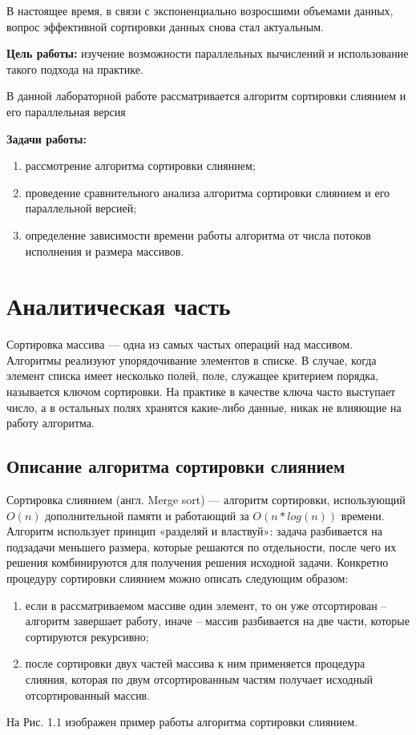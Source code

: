 \documentclass[12pt]{report}
\begin{document}
В настоящее время, в связи с экспоненциально возросшими объемами данных, вопрос эффективной сортировки данных снова стал актуальным.\vspace{\baselineskip} 

\textbf{Цель работы:} изучение возможности параллельных вычислений и использование такого подхода на практике.\vspace{\baselineskip}

В данной лабораторной работе рассматривается алгоритм сортировки слиянием и его параллельная версия\vspace{\baselineskip}

\textbf{Задачи работы:}
\begin{enumerate}
	\item рассмотрение алгоритма сортировки слиянием;
	\item проведение сравнительного анализа алгоритма сортировки слиянием и его параллельной версией;
	\item определение зависимости времени работы алгоритма от числа потоков исполнения и размера массивов.
\end{enumerate}

\chapter{Аналитическая часть}

Сортировка массива — одна из самых частых операций над массивом. Алгоритмы реализуют упорядочивание элементов в списке. В случае, когда элемент списка имеет несколько полей, поле, служащее критерием порядка, называется ключом сортировки. На практике в качестве ключа
часто выступает число, а в остальных полях хранятся какие-либо данные,
никак не влияющие на работу алгоритма.

\section{Описание алгоритма сортировки слиянием}

Сортировка слиянием (англ. Merge sort) — алгоритм сортировки, использующий $O(n)$ дополнительной памяти и работающий за $O(n*log(n))$ времени.  Алгоритм использует принцип «разделяй и властвуй»: задача разбивается на подзадачи меньшего размера, которые решаются по отдельности, после чего их решения комбинируются для получения решения исходной задачи. Конкретно процедуру сортировки слиянием можно описать следующим образом:
\begin{enumerate}
	\item если в рассматриваемом массиве один элемент, то он уже отсортирован – алгоритм завершает работу, иначе – массив разбивается на две части, которые сортируются рекурсивно;
	\item после сортировки двух частей массива к ним применяется процедура слияния, которая по двум отсортированным частям получает исходный отсортированный массив.
\end{enumerate}
На Рис. 1.1 изображен пример работы алгоритма сортировки слиянием.
\end{document}
